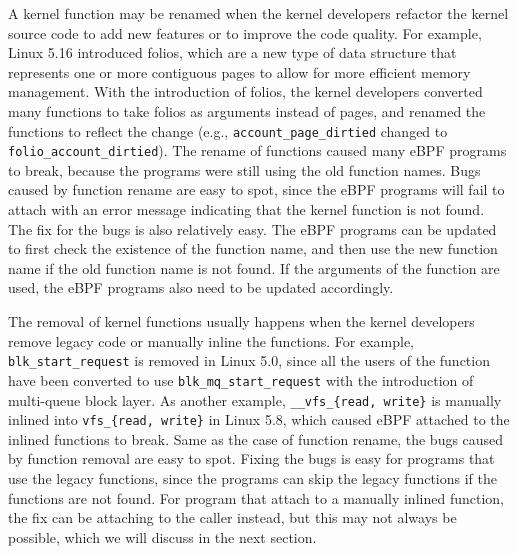 A kernel function may be renamed when the kernel developers refactor the kernel source code to add new features or to improve the code quality.
For example, Linux 5.16 introduced folios, which are a new type of data structure that represents one or more contiguous pages to allow for more efficient memory management.
With the introduction of folios, the kernel developers converted many functions to take folios as arguments instead of pages, and renamed the functions to reflect the change (e.g., \texttt{account\_page\_dirtied} changed to \texttt{folio\_account\_dirtied}).
The rename of functions caused many eBPF programs to break, because the programs were still using the old function names.
Bugs caused by function rename are easy to spot, since the eBPF programs will fail to attach with an error message indicating that the kernel function is not found.
The fix for the bugs is also relatively easy. The eBPF programs can be updated to first check the existence of the function name, and then use the new function name if the old function name is not found.
If the arguments of the function are used, the eBPF programs also need to be updated accordingly.

The removal of kernel functions usually happens when the kernel developers remove legacy code or manually inline the functions.
For example, \texttt{blk\_start\_request} is removed in Linux 5.0, since all the users of the function have been converted to use \texttt{blk\_mq\_start\_request} with the introduction of multi-queue block layer.
As another example, \texttt{\_\_vfs\_\{read, write\}} is manually inlined into \texttt{vfs\_\{read, write\}} in Linux 5.8, which caused eBPF attached to the inlined functions to break.
Same as the case of function rename, the bugs caused by function removal are easy to spot.
Fixing the bugs is easy for programs that use the legacy functions, since the programs can skip the legacy functions if the functions are not found.
For program that attach to a manually inlined function, the fix can be attaching to the caller instead, but this may not always be possible, which we will discuss in the next section.


